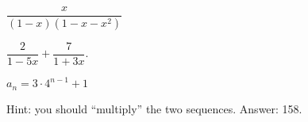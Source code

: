 \documentclass[10pt]{exam}
\begin{document}
\begin{questions}
\question $\dfrac{x}{(1-x)(1-x-x^2)}$  %

\question $\dfrac{2}{1-5x} + \dfrac{7}{1+3x}$.  %

\question $a_n = 3\cdot 4^{n-1} + 1$  %

\question Hint: you should ``multiply'' the two sequences.  Answer: 158.  %
\end{questions}
\end{document}
